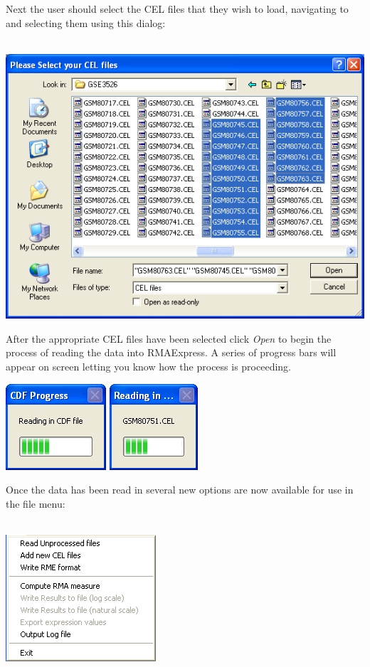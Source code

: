 \documentclass[11pt]{report}
\begin{document}
Next the user should select the CEL files that they wish to load, navigating to and selecting them using this dialog: \\ \\
\begin{center}
\includegraphics[scale=0.5]{openwindow2}
\end{center}
After the appropriate CEL files have been selected click {\it Open} to begin the process of reading the data into RMAExpress. A series of progress bars will appear on screen letting you know how the process is proceeding.
\begin{center}
\includegraphics[scale=0.5]{CDFRead}
\includegraphics[scale=0.5]{CELRead}

\end{center}



Once the data has been read in several new options are now available for use in the file menu: 
\\ \\ \begin{center}
\includegraphics[scale=0.5]{Filemenu2}
\end{center}
\end{document}
